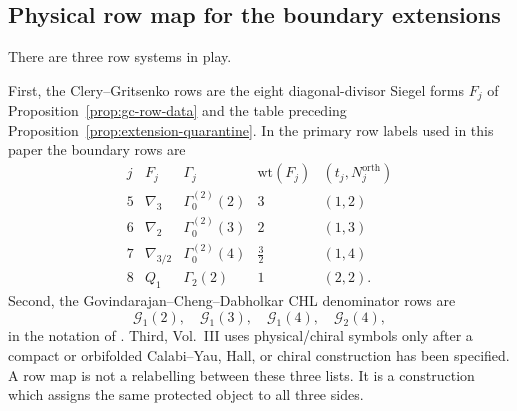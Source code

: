 \subsection{Physical row map for the boundary extensions}

\begin{definition}
There are three row systems in play.

First, the Clery--Gritsenko rows are the eight diagonal-divisor Siegel
forms $F_j$ of Proposition~\ref{prop:gc-row-data} and the table preceding
Proposition~\ref{prop:extension-quarantine}.  In the primary row labels
used in this paper the boundary rows are
$$
\begin{array}{c|c|c|c|c}
j&F_j&\Gamma_j&\mathrm{wt}(F_j)&(t_j,N_j^{\mathrm{orth}})\\ \hline
5&\nabla_3&\Gamma_0^{(2)}(2)&3&(1,2)\\
6&\nabla_2&\Gamma_0^{(2)}(3)&2&(1,3)\\
7&\nabla_{3/2}&\Gamma_0^{(2)}(4)&\frac32&(1,4)\\
8&Q_1&\Gamma_2(2)&1&(2,2).
\end{array}
$$
Second, the Govindarajan--Cheng--Dabholkar CHL denominator rows are
$$
\mathcal G_1(2),\quad \mathcal G_1(3),\quad
\mathcal G_1(4),\quad \mathcal G_2(4),
$$
in the notation of \cite{CD09BKM,Gov11BKM}.  Third, Vol.~III uses
physical/chiral symbols only after a compact or orbifolded
Calabi--Yau, Hall, or chiral construction has been specified.  A row
map is not a relabelling between these three lists.  It is a construction
which assigns the same protected object to all three sides.
\end{definition}

